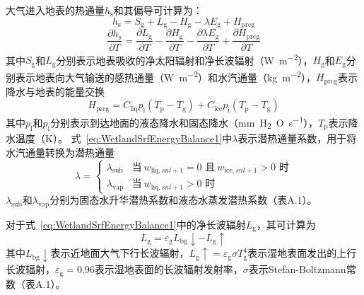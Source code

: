 大气进入地表的热通量$h_{\mathrm {s}} $和其偏导可计算为：
\begin{equation}\label{eq:WetlandSrfEnergyBalance1}
  h_{\mathrm {s}}  = S_{\mathrm {g}}  + L_{\mathrm {g}}  - H_{\mathrm {g}}  - \lambda E_{\mathrm {g}}  + H_{\mathrm{prcg}}
\end{equation}
\begin{equation}
  \frac{\partial h_{\mathrm {s}} }{\partial T} = \frac{\partial L_{\mathrm {g}} }{\partial T} -\frac{\partial H_{\mathrm {g}} }{\partial T} -\frac{\partial \lambda E_{\mathrm {g}} }{\partial T} +\frac{\partial H_{\mathrm{prcg}}}{\partial T}
\end{equation}
其中$S_{\mathrm {g}} $和$L_{\mathrm {g}} $分别表示地表吸收的净太阳辐射和净长波辐射（\unit{W.m^{-2}}），$H_{\mathrm {g}} $和$E_{\mathrm {g}} $分别表示地表向大气输送的感热通量（\unit{W.m^{-2}}）和水汽通量（\unit{kg.m^{-2}}），$H_{\mathrm{prcg}}$表示降水与地表的能量交换
\begin{equation}
  H_{\mathrm{prcg}} = C_{\mathrm{liq}}p_{\mathrm {l}} \left(T_{\mathrm {p}} -T_{\mathrm {g}} \right) + C_{\mathrm{ice}}p_{\mathrm {i}} \left(T_{\mathrm {p}} -T_{\mathrm {g}} \right)
\end{equation}
其中$p_{\mathrm {l}} $和$p_{\mathrm {i}} $分别表示到达地面的液态降水和固态降水（\unit{mm.H_2O.s^{-1}}），$T_{\mathrm {p}} $表示降水温度（K）。
式~\eqref{eq:WetlandSrfEnergyBalance1}中$\lambda$表示潜热通量系数，用于将水汽通量转换为潜热通量
\begin{equation}
  \lambda = \begin{cases}
    \lambda_{\mathrm {sub}}  &\text{当}\ w_{\mathrm{liq},snl+1}=0\text{ 且}\ w_{\mathrm{ice},snl+1}>0\text{ 时}\\
    \lambda_{\mathrm {vap}}  &\text{当}\ w_{\mathrm{liq},snl+1}>0\text{ 时}
  \end{cases}
\end{equation}
$\lambda_{\mathrm {sub}} $和$\lambda_{\mathrm {vap}} $分别为固态水升华潜热系数和液态水蒸发潜热系数（表A.1）。

对于式~\eqref{eq:WetlandSrfEnergyBalance1}中的净长波辐射$L_{\mathrm {g}} $，其可计算为
\begin{equation}
  L_{\mathrm {g}}  = \varepsilon_{\mathrm {g}}  L_{\mathrm{bg}}\downarrow - L_{\mathrm {g}} \uparrow
\end{equation}
其中$L_{\mathrm{bg}}\downarrow$表示近地面大气下行长波辐射，$L_{\mathrm {g}} \uparrow=\varepsilon_{\mathrm {g}} \sigma T^4_{\mathrm {g}} $表示湿地表面发出的上行长波辐射，$\varepsilon_{\mathrm {g}} =0.96$表示湿地表面的长波辐射发射率，$\sigma$表示Stefan-Boltzmann常数（表A.1）。

